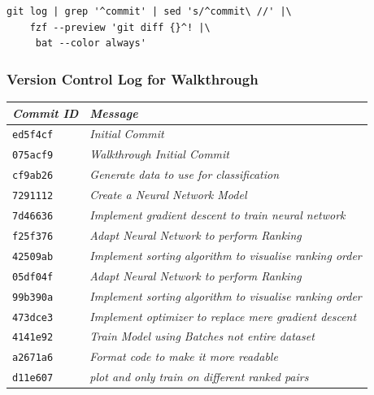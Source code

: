 \documentclass[a4paper,11pt,twoside]{article}
\begin{document}
\begin{verbatim}
git log | grep '^commit' | sed 's/^commit\ //' |\
    fzf --preview 'git diff {}^! |\
     bat --color always'  
\end{verbatim}

\subsubsection{Version Control Log for Walkthrough}
\label{sec:org5a1892f}
\begin{center}
\begin{tabular}{ll}
\textbf{\emph{Commit ID}} & \textbf{\emph{Message}}\\
\hline
\texttt{ed5f4cf} & \emph{Initial Commit}\\
\texttt{075acf9} & \emph{Walkthrough Initial Commit}\\
\texttt{cf9ab26} & \emph{Generate data to use for classification}\\
\texttt{7291112} & \emph{Create a Neural Network Model}\\
\texttt{7d46636} & \emph{Implement gradient descent to train neural network}\\
\texttt{f25f376} & \emph{Adapt Neural Network to perform Ranking}\\
\texttt{42509ab} & \emph{Implement sorting algorithm to visualise ranking order}\\
\texttt{05df04f} & \emph{Adapt Neural Network to perform Ranking}\\
\texttt{99b390a} & \emph{Implement sorting algorithm to visualise ranking order}\\
\texttt{473dce3} & \emph{Implement optimizer to replace mere gradient descent}\\
\texttt{4141e92} & \emph{Train Model using Batches not entire dataset}\\
\texttt{a2671a6} & \emph{Format code to make it more readable}\\
\texttt{d11e607} & \emph{plot and only train on different ranked pairs}\\
\end{tabular}

\end{center}
\end{document}
